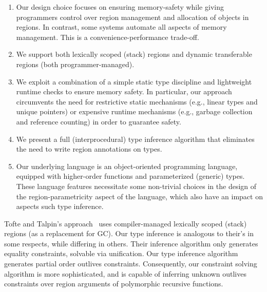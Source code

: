 \begin{enumerate}
\item 
   Our design choice focuses on ensuring memory-safety while giving programmers
   control over  region management and allocation of objects in regions.
   In contrast, some systems automate all aspects of memory management.
   This is a convenience-performance trade-off.

\item We support both lexically scoped (stack) regions and dynamic transferable
regions (both programmer-managed).

\item We exploit a combination of a simple static type discipline and lightweight
  runtime checks to ensure memory safety.
In particular, our approach circumvents the need for restrictive
static mechanisms (e.g., linear types and unique pointers) or
expensive runtime mechanisms (e.g., garbage collection and reference
counting) in order to guarantee safety.

\item We present a full (interprocedural) type inference algorithm
that eliminates the need to write region annotations on types.

\item Our underlying language is an object-oriented programming language,
equipped with higher-order functions and parameterized (generic) types.
These language features necessitate some non-trivial choices in the design
of the region-parametricity aspect of the language, which also have an
impact on aspects such type inference.

\end{enumerate}

Tofte and Talpin's approach~\cite{tofte97} uses compiler-managed lexically
scoped (stack) regions (as a replacement for GC).
Our type inference is analogous to their's in some respects,
while differing in others.
Their inference algorithm only generates equality constraints, solvable via unification.
Our type inference algorithm generates partial order outlives constraints.
Consequently, our constraint solving algorithm is
more sophisticated, and is capable of inferring unknown outlives
constraints over region arguments of polymorphic recursive functions.

